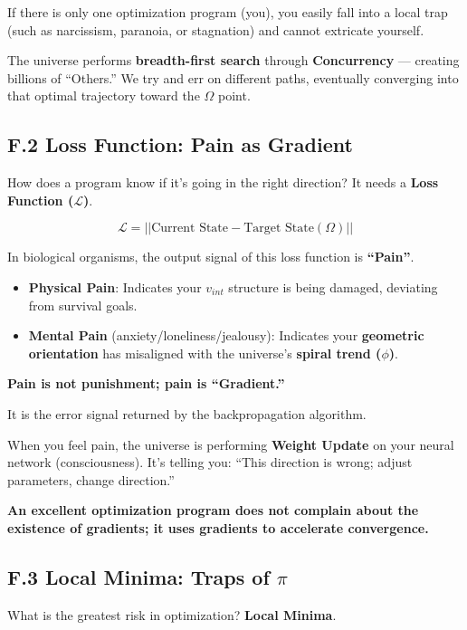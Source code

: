 If there is only one optimization program (you), you easily fall into a local trap (such as narcissism, paranoia, or stagnation) and cannot extricate yourself.

The universe performs \textbf{breadth-first search} through \textbf{Concurrency} --- creating billions of ``Others.'' We try and err on different paths, eventually converging into that optimal trajectory toward the $\Omega$ point.

\subsection{F.2 Loss Function: Pain as Gradient}

How does a program know if it's going in the right direction? It needs a \textbf{Loss Function ($\mathcal{L}$)}.

\[\mathcal{L} = || \text{Current State} - \text{Target State}(\Omega) ||\]

In biological organisms, the output signal of this loss function is \textbf{``Pain''}.

\begin{itemize}
\item \textbf{Physical Pain}: Indicates your $v_{int}$ structure is being damaged, deviating from survival goals.

\item \textbf{Mental Pain} (anxiety/loneliness/jealousy): Indicates your \textbf{geometric orientation} has misaligned with the universe's \textbf{spiral trend ($\phi$)}.
\end{itemize}

\textbf{Pain is not punishment; pain is ``Gradient.''}

It is the error signal returned by the backpropagation algorithm.

When you feel pain, the universe is performing \textbf{Weight Update} on your neural network (consciousness). It's telling you: ``This direction is wrong; adjust parameters, change direction.''

\textbf{An excellent optimization program does not complain about the existence of gradients; it uses gradients to accelerate convergence.}

\subsection{F.3 Local Minima: Traps of $\pi$}

What is the greatest risk in optimization? \textbf{Local Minima}.

